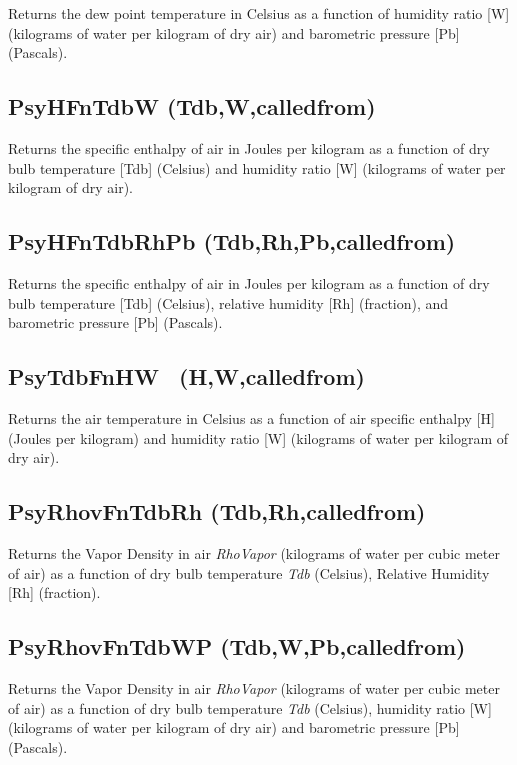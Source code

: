 Returns the dew point temperature in Celsius as a function of humidity ratio {[}W{]} (kilograms of water per kilogram of dry air) and barometric pressure {[}Pb{]} (Pascals).

\subsection{PsyHFnTdbW (Tdb,W,calledfrom)}\label{psyhfntdbw-tdbwcalledfrom}

Returns the specific enthalpy of air in Joules per kilogram as a function of dry bulb temperature {[}Tdb{]} (Celsius) and humidity ratio {[}W{]} (kilograms of water per kilogram of dry air).

\subsection{PsyHFnTdbRhPb (Tdb,Rh,Pb,calledfrom)}\label{psyhfntdbrhpb-tdbrhpbcalledfrom}

Returns the specific enthalpy of air in Joules per kilogram as a function of dry bulb temperature {[}Tdb{]} (Celsius), relative humidity {[}Rh{]} (fraction), and barometric pressure {[}Pb{]} (Pascals).

\subsection{PsyTdbFnHW~ (H,W,calledfrom)}\label{psytdbfnhw-hwcalledfrom}

Returns the air temperature in Celsius as a function of air specific enthalpy {[}H{]} (Joules per kilogram) and humidity ratio {[}W{]} (kilograms of water per kilogram of dry air).

\subsection{PsyRhovFnTdbRh (Tdb,Rh,calledfrom)}\label{psyrhovfntdbrh-tdbrhcalledfrom}

Returns the Vapor Density in air \emph{RhoVapor} (kilograms of water per cubic meter of air) as a function of dry bulb temperature \emph{Tdb} (Celsius), Relative Humidity {[}Rh{]} (fraction).

\subsection{PsyRhovFnTdbWP (Tdb,W,Pb,calledfrom)}\label{psyrhovfntdbwp-tdbwpbcalledfrom}

Returns the Vapor Density in air \emph{RhoVapor} (kilograms of water per cubic meter of air) as a function of dry bulb temperature \emph{Tdb} (Celsius), humidity ratio {[}W{]} (kilograms of water per kilogram of dry air) and barometric pressure {[}Pb{]} (Pascals).

